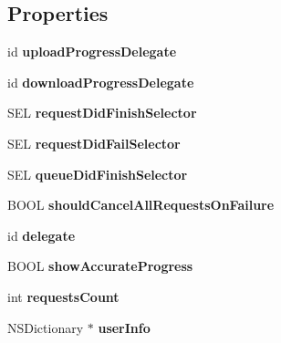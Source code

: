 \subsection*{Properties}
\begin{DoxyCompactItemize}
\item 
\hypertarget{interface_a_s_i_network_queue_ab7fe37cc9051ccd13ab3aeef7e8d6479}{
id {\bfseries uploadProgressDelegate}}
\label{interface_a_s_i_network_queue_ab7fe37cc9051ccd13ab3aeef7e8d6479}

\item 
\hypertarget{interface_a_s_i_network_queue_a96c9d1d79946b7b579ee8a927298e5f0}{
id {\bfseries downloadProgressDelegate}}
\label{interface_a_s_i_network_queue_a96c9d1d79946b7b579ee8a927298e5f0}

\item 
\hypertarget{interface_a_s_i_network_queue_ac8b9b906deaecd8a59d370d88129b3ad}{
SEL {\bfseries requestDidFinishSelector}}
\label{interface_a_s_i_network_queue_ac8b9b906deaecd8a59d370d88129b3ad}

\item 
\hypertarget{interface_a_s_i_network_queue_a958b009cbd9758186f6ee80e1f9e8192}{
SEL {\bfseries requestDidFailSelector}}
\label{interface_a_s_i_network_queue_a958b009cbd9758186f6ee80e1f9e8192}

\item 
\hypertarget{interface_a_s_i_network_queue_a6ccfadf78ae1de4c5d339a5abfc30b53}{
SEL {\bfseries queueDidFinishSelector}}
\label{interface_a_s_i_network_queue_a6ccfadf78ae1de4c5d339a5abfc30b53}

\item 
\hypertarget{interface_a_s_i_network_queue_a34b187d9867b55c8444abc6cd6bee2ca}{
BOOL {\bfseries shouldCancelAllRequestsOnFailure}}
\label{interface_a_s_i_network_queue_a34b187d9867b55c8444abc6cd6bee2ca}

\item 
\hypertarget{interface_a_s_i_network_queue_a20889184e5301a72c4be48f7fe64c07f}{
id {\bfseries delegate}}
\label{interface_a_s_i_network_queue_a20889184e5301a72c4be48f7fe64c07f}

\item 
\hypertarget{interface_a_s_i_network_queue_ae23ba0c50fb37d69b439d089dacd93cd}{
BOOL {\bfseries showAccurateProgress}}
\label{interface_a_s_i_network_queue_ae23ba0c50fb37d69b439d089dacd93cd}

\item 
\hypertarget{interface_a_s_i_network_queue_a7f329966c4e2b45cf3a27fbeab08bad2}{
int {\bfseries requestsCount}}
\label{interface_a_s_i_network_queue_a7f329966c4e2b45cf3a27fbeab08bad2}

\item 
\hypertarget{interface_a_s_i_network_queue_ae561eee119fad8abe68872654fb7990c}{
NSDictionary $\ast$ {\bfseries userInfo}}
\label{interface_a_s_i_network_queue_ae561eee119fad8abe68872654fb7990c}

\end{DoxyCompactItemize}



